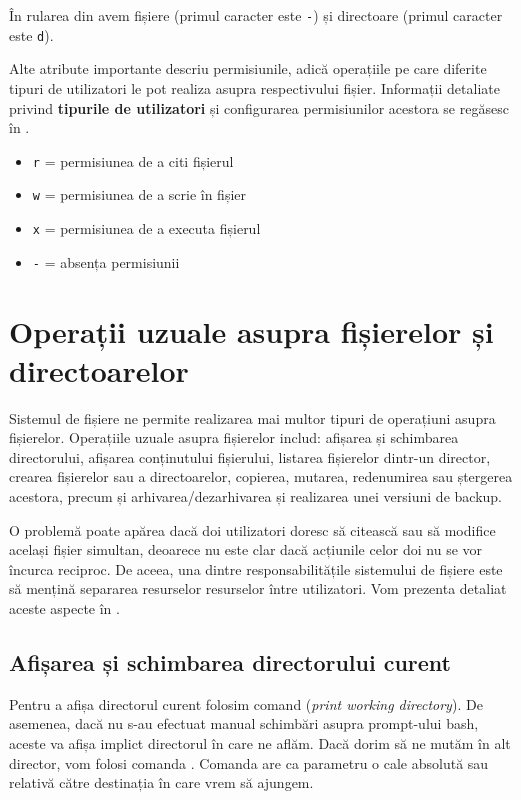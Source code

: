 În rularea din  avem fișiere (primul caracter este \texttt{-}) și directoare (primul caracter este \texttt{d}).

Alte atribute importante descriu permisiunile, adică operațiile pe care diferite tipuri de utilizatori le pot realiza asupra respectivului fișier.
Informații detaliate privind \textbf{tipurile de utilizatori} și configurarea permisiunilor acestora se regăsesc în .

\begin{itemize}
  \item \texttt{r} = permisiunea de a citi fișierul
  \item \texttt{w} = permisiunea de a scrie în fișier
  \item \texttt{x} = permisiunea de a executa fișierul
  \item \texttt{-} = absența permisiunii
\end{itemize}

\section{Operații uzuale asupra fișierelor și directoarelor}
\label{sec:fs:file-ops}

Sistemul de fișiere ne permite realizarea mai multor tipuri de operațiuni asupra fișierelor.
Operațiile uzuale asupra fișierelor includ: afișarea și schimbarea directorului, afișarea conținutului fișierului, listarea fișierelor dintr-un director, crearea fișierelor sau a directoarelor, copierea, mutarea, redenumirea sau ștergerea acestora, precum și arhivarea/dezarhivarea și realizarea unei versiuni de backup.

O problemă poate apărea dacă doi utilizatori doresc să citească sau să modifice același fișier simultan, deoarece nu este clar dacă acțiunile celor doi nu se vor încurca reciproc.
De aceea, una dintre responsabilitățile sistemului de fișiere este să mențină separarea resurselor resurselor între utilizatori.
Vom prezenta detaliat aceste aspecte în .

\subsection{Afișarea și schimbarea directorului curent}
\label{sec:fs:pwd-cd}

Pentru a afișa directorul curent folosim comand  (\textit{print working directory}).
De asemenea, dacă nu s-au efectuat manual schimbări asupra prompt-ului bash, aceste va afișa implict directorul în care ne aflăm.
Dacă dorim să ne mutăm în alt director, vom folosi comanda .
Comanda  are ca parametru o cale absolută sau relativă către destinația în care vrem să ajungem.

